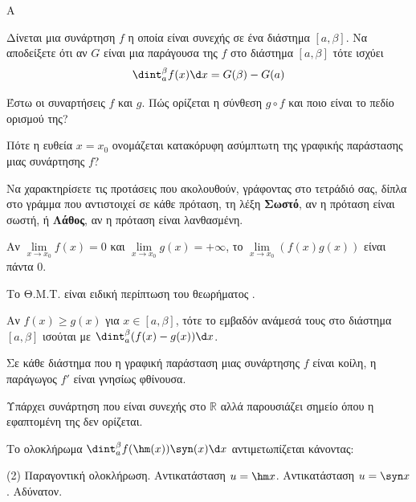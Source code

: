\begin{thema}{A}
\begin{erwthma}
    \item Δίνεται μια συνάρτηση $ f $ η οποία είναι συνεχής σε ένα διάστημα $ [a,\beta] $. Να αποδείξετε ότι αν $ G $ είναι μια παράγουσα της $ f $ στο διάστημα $ [a,\beta] $ τότε ισχύει \[ \dint_{a}^{\beta}{f(x)}\d x=G(\beta)-G(a) \]
    \item Έστω οι συναρτήσεις $f$ και $g$. Πώς ορίζεται η σύνθεση $g \circ f$ και ποιο είναι το πεδίο ορισμού της?
    \item Πότε η ευθεία $x=x_0$ ονομάζεται κατακόρυφη ασύμπτωτη της γραφικής παράστασης μιας συνάρτησης $f$?
    \item Να χαρακτηρίσετε τις προτάσεις που ακολουθούν, γράφοντας στο τετράδιό σας, δίπλα στο γράμμα που αντιστοιχεί σε κάθε πρόταση, τη λέξη \textbf{Σωστό}, αν η πρόταση είναι σωστή, ή \textbf{Λάθος}, αν η πρόταση είναι λανθασμένη.
    \begin{alist}
        \item Αν $\lim\limits_{x\to x_0} f(x) = 0$ και $\lim\limits_{x\to x_0} g(x) = +\infty$, το $\lim\limits_{x\to x_0} (f(x)g(x))$ είναι πάντα 0.
        \item Το Θ.Μ.Τ. είναι ειδική περίπτωση του θεωρήματος .
        \item Αν $f(x) \geq g(x)$ για $x \in [a, \beta]$, τότε το εμβαδόν ανάμεσά τους στο διάστημα $[a,\beta]$ ισούται με $\dint_{a}^{\beta} (f(x)-g(x)) \d x$.
        \item Σε κάθε διάστημα που η γραφική παράσταση μιας συνάρτησης $f$ είναι κοίλη, η παράγωγος $f'$ είναι γνησίως φθίνουσα.
        \item Υπάρχει συνάρτηση που είναι συνεχής στο $\mathbb{R}$ αλλά παρουσιάζει σημείο όπου η εφαπτομένη της δεν ορίζεται.
    \end{alist}
    \item Το ολοκλήρωμα $\dint_{a}^{\beta} f(\hm(x)) \syn(x) \d x$ αντιμετωπίζεται κάνοντας:
    \begin{tasks}[label=\let\textdexiakeraia\relax\alph*.](2)
        \task Παραγοντική ολοκλήρωση.
        \task Αντικατάσταση $u = \hm x$.
        \task Αντικατάσταση $u = \syn x$.
        \task Αδύνατον.
    \end{tasks}
\end{erwthma}
\end{thema}


